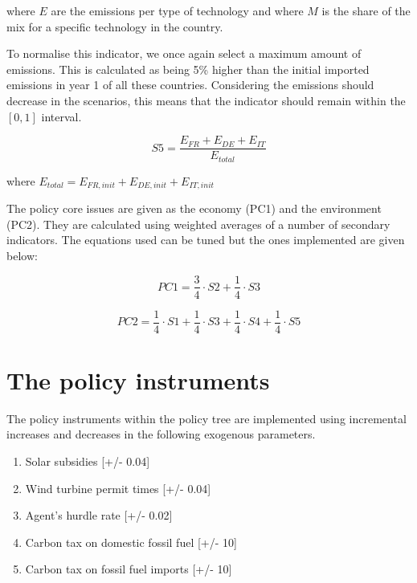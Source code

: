 \documentclass[12pt]{article}
\begin{document}
where $E$ are the emissions per type of technology and where $M$ is the share of the mix for a specific technology in the country.

To normalise this indicator, we once again select a maximum amount of emissions. This is calculated as being 5\% higher than the initial imported emissions in year 1 of all these countries. Considering the emissions should decrease in the scenarios, this means that the indicator should remain within the $[0, 1]$ interval.

\begin{equation}
S5 = \frac{ E_{FR} + E_{DE} + E_{IT} }{ E_{total}}
\end{equation}

where $E_{total} = E_{FR, init} + E_{DE, init} + E_{IT, init}$


The policy core issues are given as the economy (PC1) and the environment (PC2). They are calculated using weighted averages of a number of secondary indicators. The equations used can be tuned but the ones implemented are given below:

\begin{equation}
PC1 = \frac{3}{4} \cdot S2 + \frac{1}{4} \cdot S3
\end{equation}

\begin{equation}
PC2 = \frac{1}{4} \cdot S1 + \frac{1}{4} \cdot S3 + \frac{1}{4} \cdot S4 + \frac{1}{4} \cdot S5
\end{equation}








\section{The policy instruments}
\label{sec:interfaceInstruments}

The policy instruments within the policy tree are implemented using incremental increases and decreases in the following exogenous parameters.

\begin{enumerate}
\item Solar subsidies [+/- 0.04]
\item Wind turbine permit times [+/- 0.04]
\item Agent's hurdle rate  [+/- 0.02]
\item Carbon tax on domestic fossil fuel [+/- 10]
\item Carbon tax on fossil fuel imports [+/- 10]
\end{enumerate}
\end{document}
